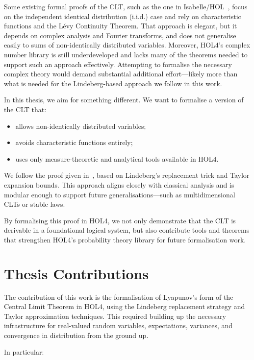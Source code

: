 Some existing formal proofs of the CLT, such as the one in Isabelle/HOL~\cite{serafin2015formally}, focus on the independent identical distribution (i.i.d.) case and rely on characteristic functions and the Lévy Continuity Theorem. That approach is elegant, but it depends on complex analysis and Fourier transforms, and does not generalise easily to sums of non-identically distributed variables. Moreover, HOL4’s complex number library is still underdeveloped and lacks many of the theorems needed to support such an approach effectively. Attempting to formalise the necessary complex theory would demand substantial additional effort—likely more than what is needed for the Lindeberg-based approach we follow in this work.

In this thesis, we aim for something different. We want to formalise a version of the CLT that:
\begin{itemize}
\item allows non-identically distributed variables;
\item avoids characteristic functions entirely;
\item uses only measure-theoretic and analytical tools available in HOL4.
\end{itemize}

We follow the proof given in~\cite{Chung:2001}, based on Lindeberg’s replacement trick and Taylor expansion bounds. This approach aligns closely with classical analysis and is modular enough to support future generalisations—such as multidimensional CLTs or stable laws.

By formalising this proof in HOL4, we not only demonstrate that the CLT is derivable in a foundational logical system, but also contribute tools and theorems that strengthen HOL4’s probability theory library for future formalisation work.

\section{Thesis Contributions}
The contribution of this work is the formalisation of Lyapunov's form of the Central Limit Theorem in HOL4, using the Lindeberg replacement strategy and Taylor approximation techniques. This required building up the necessary infrastructure for real-valued random variables, expectations, variances, and convergence in distribution from the ground up.

In particular:

